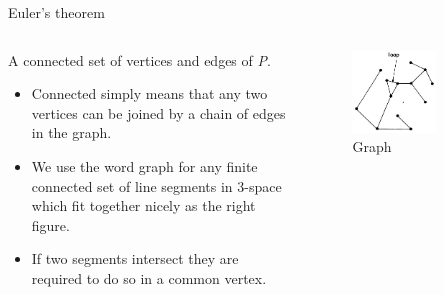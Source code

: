 \documentclass{beamer}
\begin{document}
\begin{frame}{Euler's theorem}
\begin{columns}
\begin{column}{0.5\textwidth}
  \begin{definition}[Graph]
    A connected set of vertices and edges of \textsl{P}.
    \begin{itemize}
    \item Connected simply means that any two vertices can be joined by a chain of edges in the graph.
    \item We use the word graph for any finite connected set of line segments in 3-space which fit together nicely as the right figure.
    \item If two segments intersect they are required to do so in a common vertex.
    \end{itemize}
  \end{definition}
\end{column}
\begin{column}{0.5\textwidth}
    \begin{figure}
    \centering
        \includegraphics[width=0.7\textwidth]{figure_1_4_b.png}
        \caption{Graph}
    \end{figure}
\end{column}
\end{columns}
\end{frame}
\end{document}
